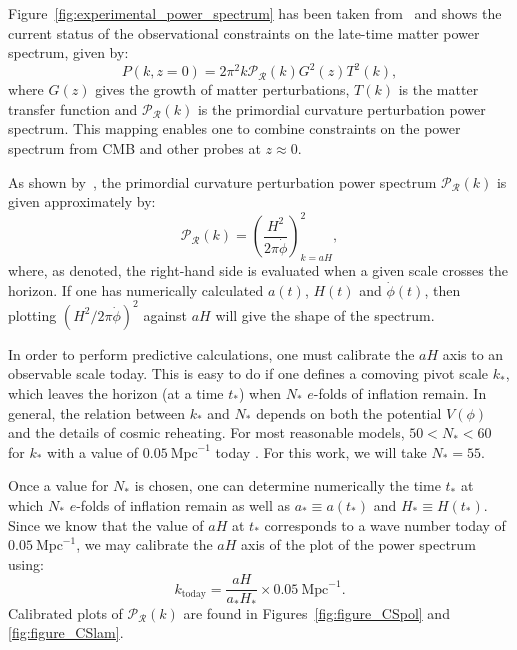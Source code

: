 Figure~\ref{fig:experimental_power_spectrum} has been taken from~\cite{hlozek_atacama_2012} and shows the current status of the observational constraints on the late-time matter power spectrum, given by:
%
\begin{equation}
  P(k,z=0) = 2\pi^2 k \mathcal{P}_\mathcal{R}(k) G^2(z) T^2(k),
\end{equation}
%
where \(G(z)\) gives the growth of matter perturbations, \(T(k)\) is the matter transfer function and \(\mathcal{P}_\mathcal{R}(k)\) is the primordial curvature perturbation power spectrum. This mapping enables one to combine constraints on the power spectrum from CMB and other probes at \(z\approx 0\).




As shown by~\cite{liddle_cosmological_2000}, the primordial curvature perturbation power spectrum \(\mathcal{P}_{\mathcal{R}}(k)\) is given approximately by:
%
\begin{equation}
  \mathcal{P}_{\mathcal{R}}(k)
  =
  {\left(\frac{H^2}{2\pi\dot{\phi}}\right)}^2_{k=a H},
  \label{eqn:curvature_power_spectrum}
\end{equation}
%
where, as denoted, the right-hand side is evaluated when a given scale crosses the horizon. If one has numerically calculated \(a(t)\), \(H(t)\) and \(\dot{\phi}(t)\), then plotting \({\left(H^2/ 2\pi\dot{\phi}\right)}^2\) against \(aH\) will give the shape of the spectrum.

In order to perform predictive calculations, one must calibrate the \(aH\) axis to an observable scale today. This is easy to do if one defines a comoving pivot scale \(k_*\), which leaves the horizon (at a time \(t_*\)) when \(N_*\) \(e\)-folds of inflation remain. In general, the relation between \(k_*\) and \(N_*\) depends on both the potential \(V(\phi)\) and the details of cosmic reheating. For most reasonable models, \(50<N_*<60\)  for \(k_*\) with a value of \(0.05\:\mathrm{Mpc}^{-1}\) today \citep{planck_collaboration_planck_2013-1}. For this work, we will take \(N_*=55\). 

Once a value for \(N_*\) is chosen, one can determine numerically the time \(t_*\) at which \(N_*\) \(e\)-folds of inflation remain as well as \(a_*\equiv a(t_*)\) and \(H_*\equiv H(t_*)\). Since we know that the value of \(aH\) at \(t_*\) corresponds to a wave number today of \(0.05\:\mathrm{Mpc}^{-1}\), we may calibrate the \(aH\) axis of the plot of the power spectrum using:
%
\begin{equation}
  k_\mathrm{today} 
  = 
  \frac{aH}{a_*H_*}\times0.05\:\mathrm{Mpc}^{-1}.
\end{equation}
%
Calibrated plots of \(\mathcal{P}_\mathcal{R}(k)\) are found in Figures~\ref{fig:figure_CSpol} and \nolinebreak\ref{fig:figure_CSlam}. 


